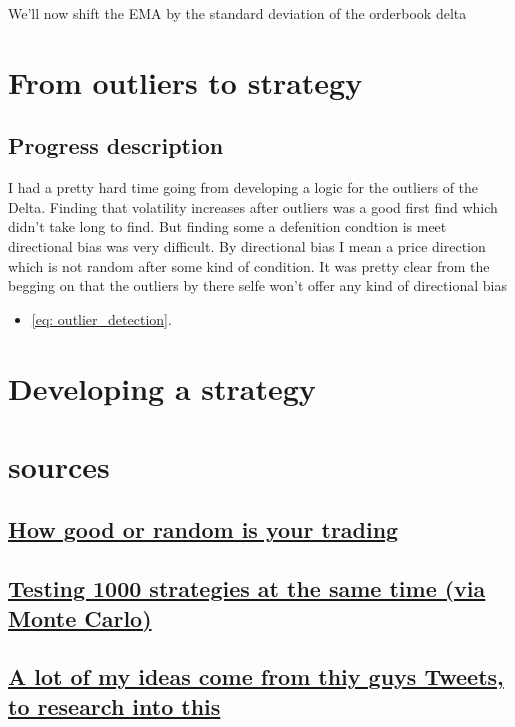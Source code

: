 \documentclass[12pt]{article}
\begin{document}
We'll now shift the EMA by the standard deviation of the orderbook delta 




\newpage
\section*{From outliers to strategy}
\subsection*{Progress description}
I had a pretty hard time going from developing a logic for the outliers of the Delta. Finding that volatility increases after outliers was a good first find which didn't take long to find. But finding some a defenition condtion is meet directional bias was very difficult. By directional bias I mean a price direction which is not random after some kind of condition. It was pretty clear from the begging on that the outliers by there selfe won't offer any kind of directional bias


\begin{itemize}
  \item \eqref{eq: outlier_detection}.
\end{itemize}





\newpage
\section*{Developing a strategy}


\newpage
\section*{sources}
\subsection*{\href{https://x.com/HangukQuant/status/1930603876069335120}{How good or random is your trading}}
\subsection*{\href{https://github.com/polakowo/vectorbt}{Testing 1000 strategies at the same time (via Monte Carlo)}}
\subsection*{\href{https://x.com/abetrade/status/1941613701150188008}{ A lot of my ideas come from thiy guys Tweets, to research into this}}
\end{document}
